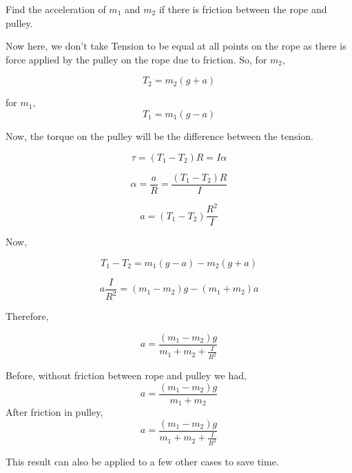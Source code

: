 \documentclass[twocolumn]{article}
\begin{document}
\begin{CJK*}{UTF8}{gbsn}
\begin{question}
    Find the acceleration of \(m_1\) and \(m_2\) if there is friction between the rope and pulley. 
    \begin{center}
    \end{center}
\end{question}

Now here, we don't take Tension to be equal at all points on the rope as there is force applied by the pulley on the rope due to friction. So, for \(m_2\),

\[
    T_2 = m_2 (g + a)
\]

for \(m_1\),
\[
    T_1 = m_1 (g - a)
\]

Now, the torque on the pulley will be the difference between the tension. 

\[
    \tau = (T_1 - T_2)R = I \alpha 
\]

\[
    \alpha = \frac{a}{R} = \frac{(T_1 - T_2)R}{I}
\]

\[
    a = (T_1 - T_2) \frac{R^{2}}{I}
\]

Now, 

\[
    T_1 - T_2 = m_1 (g - a) - m_2 (g + a)
\]

\[
    a \frac{I}{R^{2} } = (m_{1} - m_2)g - (m_1 + m_2)a 
\]

Therefore, 

\[
    \boxed{a = \frac{(m_{1} - m_2)g}{m_1 + m_2 + \frac{I}{R^{2} }}}
\]

\vspace{0.1in}

\begin{shortcut}
    Before, without friction between rope and pulley we had, 
   \[
       a = \frac{(m_{1} - m_2)g}{m_1 + m_2}
   \]
   After friction in pulley, 
   \[
       a = \frac{(m_{1} - m_2)g}{m_1 + m_2 + \frac{I}{R^{2} }}
   \]

   This result can also be applied to a few other cases to save time. 


\end{shortcut}
\end{CJK*}
\end{document}

